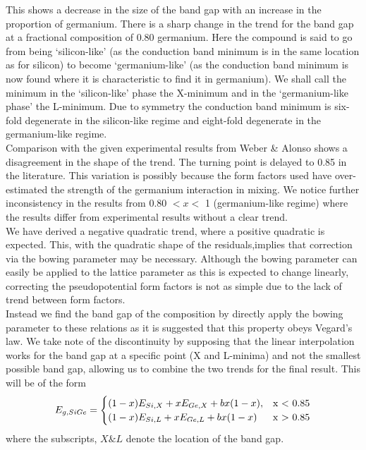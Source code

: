 \documentclass[10pt, twocolumn]{revtex4}    %
\begin{document}
This shows a decrease in the size of the band gap with an increase in the proportion of germanium. There is a sharp change in the trend for the band gap at a fractional composition of 0.80 germanium. Here the compound is said to go from being `silicon-like' (as the conduction band minimum is in the same location as for silicon) to become `germanium-like' (as the conduction band minimum is now found where it is characteristic to find it in germanium). We shall call the minimum in the `silicon-like' phase the X-minimum and in the `germanium-like phase' the L-minimum. Due to symmetry the conduction band minimum is six-fold degenerate in the silicon-like regime and eight-fold degenerate in the germanium-like regime. \\

Comparison with the given experimental results from Weber \& Alonso \cite{ref12} shows a disagreement in the shape of the trend. The turning point is delayed to 0.85 in the literature. This variation is possibly because the form factors used have over-estimated the strength of the germanium interaction in mixing. We notice further inconsistency in the results from 0.80 $< x <$ 1 (germanium-like regime) where the results differ from experimental results without a clear trend.\\

We have derived a negative quadratic trend, where a positive quadratic is expected. This, with the quadratic shape of the residuals,implies that correction via the bowing parameter may be necessary. Although the bowing parameter can easily be applied to the lattice parameter \cite{ref05} as this is expected to change linearly, correcting the pseudopotential form factors is not as simple due to the lack of trend between form factors. \\

Instead we find the band gap of the composition by directly apply the bowing parameter to these relations as it is suggested that this property obeys Vegard's law. We take note of the discontinuity by supposing that the linear interpolation works for the band gap at a specific point (X and L-minima) and not the smallest possible band gap, allowing us to combine the two trends for the final result. This will be of the form \cite{ref18}
\begin{equation}
E_{g,SiGe} =
    \begin{cases}
      (1-x) E_{Si,X}  +  xE_{Ge,X} + bx(1-x), & \text{x \textless \  0.85}\\
      (1-x) E_{Si,L}  +  x E_{Ge,L} + bx(1-x) & \text{x \textgreater \ 0.85}\\
    \end{cases}
\end{equation}
where the subscripts, $X \& L$ denote the location of the band gap.\\
\end{document}
